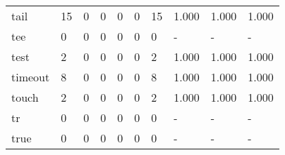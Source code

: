\begin{longtable}{lp{1.3cm}p{1.3cm}p{1.3cm}p{1.3cm}p{1.3cm}p{1.3cm}p{1.3cm}p{1.3cm}p{1.3cm}}
tail      &                     15 &                                  0 &                                 0 &                                0 &                                 0 &                              15 &                                1.000 &                                  1.000 &                                1.000 \\
tee       &                      0 &                                  0 &                                 0 &                                0 &                                 0 &                               0 &                                    - &                                      - &                                    - \\
test      &                      2 &                                  0 &                                 0 &                                0 &                                 0 &                               2 &                                1.000 &                                  1.000 &                                1.000 \\
timeout   &                      8 &                                  0 &                                 0 &                                0 &                                 0 &                               8 &                                1.000 &                                  1.000 &                                1.000 \\
touch     &                      2 &                                  0 &                                 0 &                                0 &                                 0 &                               2 &                                1.000 &                                  1.000 &                                1.000 \\
tr        &                      0 &                                  0 &                                 0 &                                0 &                                 0 &                               0 &                                    - &                                      - &                                    - \\
true      &                      0 &                                  0 &                                 0 &                                0 &                                 0 &                               0 &                                    - &                                      - &                                    - \\

\end{longtable}
